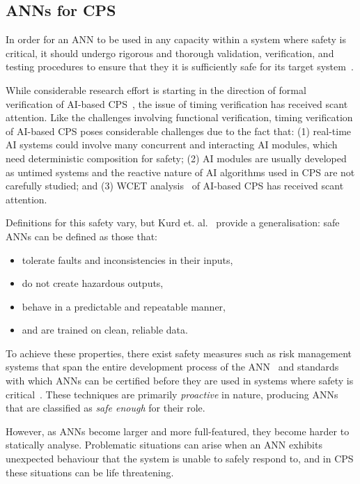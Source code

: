 \subsection{\acfp{ANN} for \acf{CPS}}
In order for an \ac{ANN} to be used in any capacity within a system where safety is critical, it should undergo rigorous and thorough validation, verification, and testing procedures to ensure that they it is sufficiently safe for its target system~\cite{scann, ANNSafetyLifecycle2003}. 

While considerable research effort is starting in the direction of formal verification of \ac{AI}-based \ac{CPS}~\cite{seshia2016towards, russell2015}, the issue of timing verification has received scant attention. 
Like the challenges involving functional verification, timing verification of AI-based  \ac{CPS} poses considerable challenges due to the fact that: (1) real-time \ac{AI} systems could involve many concurrent and interacting \ac{AI} modules, which need deterministic composition for safety; (2) \ac{AI} modules are usually developed as untimed systems and the reactive nature of AI algorithms used in CPS are not carefully studied; and (3) \acf{WCET} analysis~\cite{wilhelm2008worst} of \ac{AI}-based \ac{CPS} has received scant attention.

Definitions for this safety vary, but Kurd et. al.~\cite{EstSafeCriteria2003} provide a generalisation: safe \acp{ANN} can be defined as those that:
\begin{itemize}
	\item tolerate faults and inconsistencies in their inputs,
	\item do not create hazardous outputs,
	\item behave in a predictable and repeatable manner,
	\item and are trained on clean, reliable data. 
\end{itemize}

To achieve these properties, there exist safety measures such as risk management systems that span the entire development process of the \ac{ANN}~\cite{ANNDevModel1999} and standards with which \acp{ANN} can be certified before they are used in systems where safety is critical~\cite{SCANNStandard}. 
These techniques are primarily \textit{proactive} in nature, producing \acp{ANN} that are classified as \textit{safe enough} for their role. 

However, as \acp{ANN} become larger and more full-featured, they  become harder to statically analyse.
Problematic situations can arise when an \ac{ANN} exhibits unexpected behaviour that the system is unable to safely respond to, and in \ac{CPS} these situations can be life threatening.

